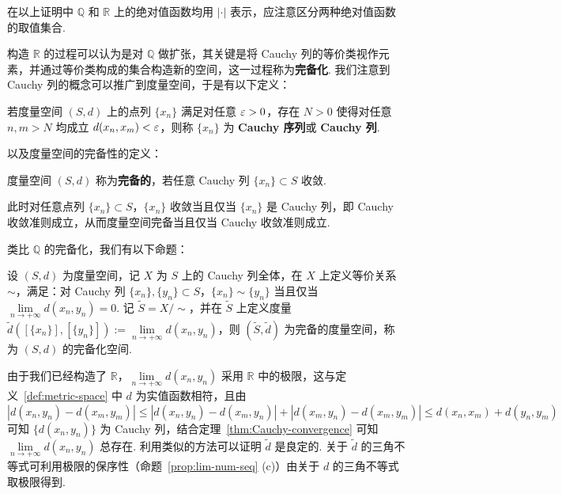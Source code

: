 \documentclass[../main.tex]{subfiles}
\begin{document}
\begin{remark}
    在以上证明中 $\mathbb Q$ 和 $\mathbb R$ 上的绝对值函数均用 $|\cdot|$ 表示，应注意区分两种绝对值函数的取值集合. 
\end{remark}

构造 $\mathbb R$ 的过程可以认为是对 $\mathbb Q$ 做扩张，其关键是将 Cauchy 列的等价类视作元素，并通过等价类构成的集合构造新的空间，这一过程称为\textbf{完备化}. 我们注意到 Cauchy 列的概念可以推广到度量空间，于是有以下定义：

\begin{definition} \label{def:Cauchy-seq-ms}
    若度量空间 $(S, d)$ 上的点列 $\{x_n\}$ 满足对任意 $\varepsilon > 0$，存在 $N > 0$ 使得对任意 $n, m > N$ 均成立 $d(x_n, x_m) < \varepsilon$，则称 $\{x_n\}$ 为 \textbf{Cauchy 序列}或 \textbf{Cauchy 列}. 
\end{definition}

以及度量空间的完备性的定义：

\begin{definition}[度量空间的完备性的定义]
    度量空间 $(S, d)$ 称为\textbf{完备的}，若任意 Cauchy 列 $\{x_n\} \subset S$ 收敛. 
\end{definition}

\begin{remark}
    此时对任意点列 $\{x_n\} \subset S$，$\{x_n\}$ 收敛当且仅当 $\{x_n\}$ 是 Cauchy 列，即 Cauchy 收敛准则成立，从而度量空间完备当且仅当 Cauchy 收敛准则成立. 
\end{remark}

类比 $\mathbb Q$ 的完备化，我们有以下命题：

\begin{proposition} \label{prop:completion-ms}
    设 $(S, d)$ 为度量空间，记 $X$ 为 $S$ 上的 Cauchy 列全体，在 $X$ 上定义等价关系 $\sim$，满足：对 Cauchy 列 $\{x_n\}, \{y_n\} \subset S$，$\{x_n\} \sim \{y_n\}$ 当且仅当 $\lim\limits_{n \to +\infty} d(x_n, y_n) = 0$. 记 $\widetilde{S} = X / \sim$，并在 $\widetilde{S}$ 上定义度量 $\tilde{d}([\{x_n\}], [\{y_n\}]) := \lim\limits_{n \to +\infty} d(x_n, y_n)$，则 $(\widetilde{S}, \tilde{d})$ 为完备的度量空间，称为 $(S, d)$ 的完备化空间. 
\end{proposition}

\begin{remark}
    由于我们已经构造了 $\mathbb R$，$\lim\limits_{n \to +\infty} d(x_n, y_n)$ 采用 $\mathbb R$ 中的极限，这与定义~\ref{def:metric-space} 中 $d$ 为实值函数相符，且由 $|d(x_n, y_n) - d(x_m, y_m)| \leqslant |d(x_n, y_n) - d(x_m, y_n)| + |d(x_m, y_n) - d(x_m, y_m)| \leqslant d(x_n, x_m) + d(y_n, y_m)$ 可知 $\{d(x_n, y_n)\}$ 为 Cauchy 列，结合定理~\ref{thm:Cauchy-convergence} 可知 $\lim\limits_{n \to +\infty} d(x_n, y_n)$ 总存在. 利用类似的方法可以证明 $\tilde{d}$ 是良定的. 关于 $\tilde{d}$ 的三角不等式可利用极限的保序性（命题~\ref{prop:lim-num-seq} (c)）由关于 $d$ 的三角不等式取极限得到. 
\end{remark}
\end{document}
